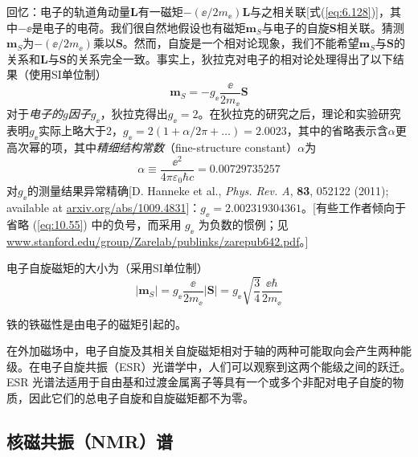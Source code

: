     回忆：电子的轨道角动量$\mathbf{L}$有一磁矩$-\left(\ee /2m_{\ee }\right)\mathbf{L}$与之相关联[式(\ref{eq:6.128})]，其中$-\ee $是电子的电荷。我们很自然地假设也有磁矩$\mathbf{m}_S$与电子的自旋$\mathbf{S}$相关联。猜测$\mathbf{m}_S$为$-\left(\ee /2m_{\ee }\right)$乘以$\mathbf{S}$。然而，自旋是一个相对论现象，我们不能希望$\mathbf{m}_S$与$\mathbf{S}$的关系和$\mathbf{L}$与$\mathbf{S}$的关系完全一致。事实上，狄拉克对电子的相对论处理得出了以下结果（使用SI单位制）
    \begin{equation}
        \mathbf{m}_S = -g_{\ee } \frac{\ee }{2m_{\ee }} \mathbf{S}
        \label{eq:10.55}
    \end{equation}
    对于\textit{电子的$g$因子$g_{\ee }$}，狄拉克得出$g_{\ee } = 2$。在狄拉克的研究之后，理论和实验研究表明$g_{\ee }$实际上略大于2，$g_{\ee } = 2\left(1 + \alpha/2\pi + \ldots\right) = 2.0023$，其中的省略表示含$\alpha$更高次幂的项，其中\textit{精细结构常数}（fine-structure constant）$\alpha$为
    \begin{equation}
        \alpha \equiv \frac{\ee ^2}{4\pi\varepsilon_0\hbar c} = 0.00729735257
        \label{eq:10.56}
    \end{equation}
    对$g_{\ee }$的测量结果异常精确[D. Hanneke et al., \textit{Phys. Rev. A}, \textbf{83}, 052122 (2011); available at \url{arxiv.org/abs/1009.4831}]：$g_{\ee } = 2.002319304361$。[有些工作者倾向于省略 (\ref{eq:10.55}) 中的负号，而采用 $g_{\ee }$ 为负数的惯例；见\url{www.stanford.edu/group/Zarelab/publinks/zarepub642.pdf}。]

    电子自旋磁矩的大小为（采用SI单位制）
    \begin{equation}
        \left|\mathbf{m}_{S}\right| = g_{\ee } \frac{\ee }{2m_{\ee }} \left|\mathbf{S}\right| = g_{\ee } \sqrt{\frac{3}{4}} \frac{\ee \hbar}{2m_{\ee }}
        \label{eq:10.57}
    \end{equation}

    铁的铁磁性是由电子的磁矩引起的。

    在外加磁场中，电子自旋及其相关自旋磁矩相对于轴的两种可能取向会产生两种能级。在电子自旋共振（ESR）光谱学中，人们可以观察到这两个能级之间的跃迁。ESR 光谱法适用于自由基和过渡金属离子等具有一个或多个非配对电子自旋的物质，因此它们的总电子自旋和自旋磁矩都不为零。

\subsection*{核磁共振（NMR）谱}

